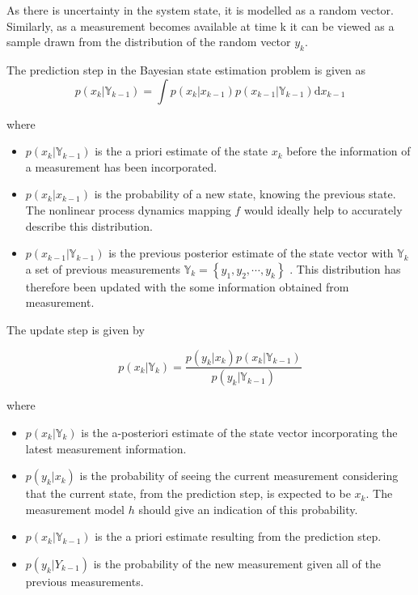 As there is uncertainty in the system state, it is modelled as a random vector. Similarly, as a measurement becomes available at time k it can be viewed as a sample drawn from the distribution of the random vector $y_k$.



The prediction step in the Bayesian state estimation problem is given as 
\begin{equation}
	p\left(x_{k} | \mathbb{Y}_{k-1}\right)=\int p\left(x_{k} | x_{k-1}\right) p\left(x_{k-1} | \mathbb{Y}_{k-1}\right) \mathrm{d} x_{k-1}
\end{equation}

where 

\begin{itemize}
	\item $p\left(x_{k} | \mathbb{Y}_{k-1}\right)$ is the a priori estimate of the state $x_k$ before the information of a measurement has been incorporated. 
	\item $p\left(x_{k} | x_{k-1}\right)$ is the probability of a new state, knowing the previous state. The nonlinear process dynamics mapping $f$ would ideally help to accurately describe this distribution.
	\item $p\left(x_{k-1} | \mathbb{Y}_{k-1}\right)$ is the previous posterior estimate of the state vector with $\mathbb{Y}_{k}$ a set of previous measurements $\mathbb{Y}_{k}=\left\{y_{1}, y_{2}, \cdots, y_{k}\right\}$ . This distribution has therefore been updated with the some information obtained from measurement. 
\end{itemize}

The update step is given by

\begin{equation}
	p\left(x_{k} | \mathbb{Y}_{k}\right)=\frac{p\left(y_{k} | x_{k}\right) p\left(x_{k} | \mathbb{Y}_{k-1}\right)}{p\left(y_{k} | \mathbb{Y}_{k-1}\right)}
\end{equation}

where 

\begin{itemize}
	\item  $p\left(x_{k} | \mathbb{Y}_{k}\right)$ is the a-posteriori estimate of the state vector incorporating the latest measurement information. 
	\item $p\left(y_{k} | x_{k}\right)$ is the probability of seeing the current measurement considering that the current state, from the prediction step, is expected to be $x_k$. The measurement model $h$ should give an indication of this probability. 
	\item $p\left(x_{k} | \mathbb{Y}_{k-1}\right)$ is the a priori estimate resulting from the prediction step.
	\item $p\left(y_{k} | Y_{k-1}\right)$ is the probability of the new measurement given all of the previous measurements. 
\end{itemize}


